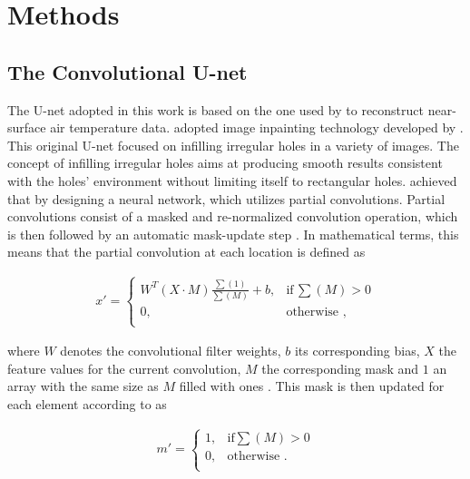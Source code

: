 \documentclass[Masterarbeit.tex]{subfile}
\begin{document}
	
	\section{Methods} \label{methods}
	
	\subsection{The Convolutional U-net} \label{method:unet}
	
	The U-net adopted in this work is based on the one used by \cite{kadow_artificial_2020} to reconstruct near-surface air temperature data. \cite{kadow_artificial_2020} adopted image inpainting technology developed by \cite{liu_image_2018}. This original U-net focused on infilling irregular holes in a variety of images. The concept of infilling irregular holes aims at producing smooth results consistent with the holes' environment without limiting itself to rectangular holes. \cite{liu_image_2018} achieved that by designing a neural network, which utilizes partial convolutions. Partial convolutions consist of a masked and re-normalized convolution operation, which is then followed by an automatic mask-update step \citep{liu_image_2018}. In mathematical terms, this means that the partial convolution at each location is defined as
	
	\begin{align}
	x' = \begin{cases}
	W^{T} (X \cdot M) \frac{\sum(1)}{\sum(M)} + b, &\text{if} \, \sum(M) > 0\\
	0, &\text{otherwise ,}\\
	\end{cases}
	\end{align}
	
	where $W$ denotes the convolutional filter weights, $b$ its corresponding bias, $X$ the feature values for the current convolution, $M$ the corresponding mask and $1$ an array with the same size as $M$ filled with ones \cite{liu_image_2018}. This mask is then updated for each element according to \cite{liu_image_2018} as
	
	\begin{align}
	m' = \begin{cases}
	1, & \text{if} \sum(M) > 0 \\
	0, & \text{otherwise .} \\
	\end{cases}
	\end{align}
	
\end{document}
